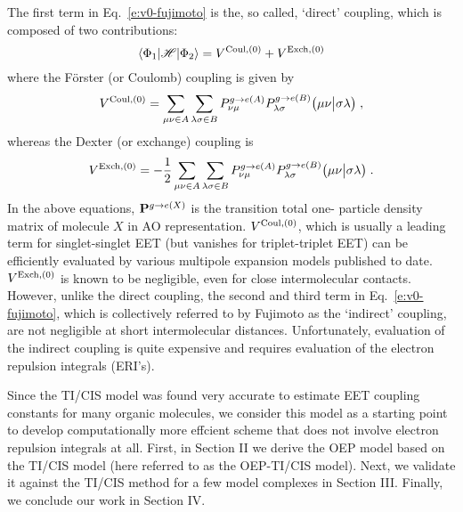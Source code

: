 The first term in Eq.~\eqref{e:v0-fujimoto} is the, so called, `direct' coupling, which is 
composed of two contributions:
%
\begin{equation}
 \left< \Phi_1 \vert \mathscr{H} \vert \Phi_2 \right> = V^{{\rm Coul},(0)} + V^{{\rm Exch},(0)}
\end{equation}
%
where the F{\"o}rster (or Coulomb) coupling is given by
%
\begin{equation}
 V^{{\rm Coul},(0)} = \sum_{\mu\nu\in A} \sum_{\lambda\sigma\in B} 
  P_{\nu\mu}^{g\rightarrow e(A)} P_{\lambda\sigma}^{g\rightarrow e(B)} 
  \bigl( {\mu\nu} \bigl\lvert {\sigma\lambda} \bigr)  \;,
\end{equation}
%
whereas the Dexter (or exchange) coupling is
%
\begin{equation}
 V^{{\rm Exch},(0)} =-\frac{1}{2} \sum_{\mu\nu\in A} \sum_{\lambda\sigma\in B} 
  P_{\nu\mu}^{g\rightarrow e(A)} P_{\lambda\sigma}^{g\rightarrow e(B)} 
  \bigl( {\mu\nu} \bigl\lvert {\sigma\lambda} \bigr)  \;.
\end{equation}
%
In the above equations, ${\bf P}^{g\rightarrow e(X)}$ is the transition total one\hyp{}
particle density matrix of molecule $X$ in AO representation. $V^{{\rm Coul},(0)}$,
which is usually a leading term for singlet-singlet EET (but vanishes for triplet-triplet EET)
can be efficiently evaluated by various multipole expansion models published to date.
$V^{{\rm Exch},(0)}$ is known to be negligible, even for close intermolecular contacts.
However, unlike the direct coupling, the second and third term in Eq.~\eqref{e:v0-fujimoto}, which is collectively
referred to by Fujimoto as the `indirect' coupling, are not negligible at short intermolecular distances.
Unfortunately, evaluation of the indirect coupling is quite expensive and requires evaluation
of the electron repulsion integrals (ERI's).

Since the TI/CIS model was found very accurate to estimate EET coupling constants for many organic
molecules, we consider this model as a starting point to develop computationally more effcient
scheme that does not involve electron repulsion integrals at all.
First, in Section II we derive the OEP model based on the TI/CIS model (here referred to as the
OEP-TI/CIS model). Next, we validate it against the TI/CIS method for a few model complexes
in Section III. 
Finally, we conclude our work in Section IV.

